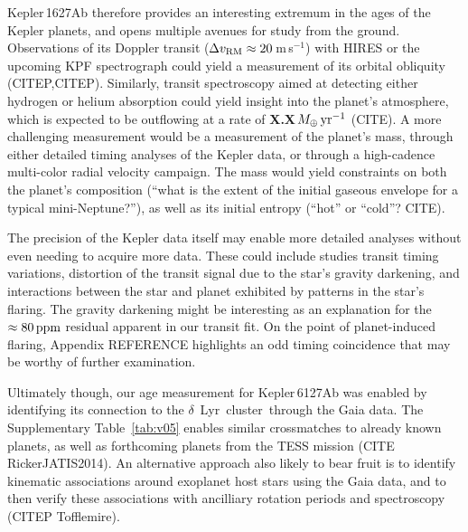 \documentclass[12pt,modern,tighten]{aastex63}
\newcommand{\cn}{$\delta$~Lyr\ cluster} %
\newcommand{\ms}{\,m\,s$^{-1}$}
\begin{document}


Kepler\,1627Ab therefore provides an interesting extremum in the ages
of the Kepler planets, and opens multiple avenues for study from the
ground.  Observations of its Doppler transit ($\Delta v_{\rm RM}
\approx 20$\ms) with HIRES or the upcoming KPF spectrograph could
yield a measurement of its orbital obliquity (CITEP,CITEP).
Similarly, transit spectroscopy aimed at detecting either hydrogen or
helium absorption could yield insight into the planet's atmosphere,
which is expected to be outflowing at a rate of {\bf
X.X}\,$M_\oplus\,{\rm yr}^{-1}$ (CITE).  A more challenging
measurement would be a measurement of the planet's mass, through
either detailed timing analyses of the Kepler data, or through a
high-cadence multi-color radial velocity campaign.  The mass would
yield constraints on both the planet's composition (``what is the
extent of the initial gaseous envelope for a typical mini-Neptune?''),
as well as its initial entropy (``hot'' or ``cold''? CITE).

The precision of the Kepler data itself may enable more detailed
analyses without even needing to acquire more data.  These could
include studies transit timing variations, distortion of the transit
signal due to the star's gravity darkening, and interactions between
the star and planet exhibited by patterns in the star's flaring.
The gravity darkening might be interesting as an explanation for the
$\approx80\,{\rm ppm}$ residual apparent in our transit fit.
On the point of planet-induced flaring, Appendix REFERENCE
highlights an odd timing coincidence that may be worthy of further
examination.  

Ultimately though, our age measurement for Kepler\,6127Ab was enabled by
identifying its connection to the \cn\ through the Gaia data.  The
Supplementary Table~\ref{tab:v05} enables similar crossmatches to
already known planets, as well as forthcoming planets from the TESS
mission (CITE RickerJATIS2014).  An alternative approach also
likely to bear fruit is to identify kinematic associations
around exoplanet host stars using the Gaia data, and to then verify
these associations with ancilliary rotation periods and spectroscopy
(CITEP Tofflemire).


\end{document}
